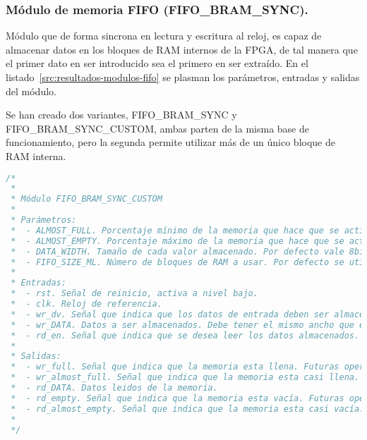 \subsubsection{Módulo de memoria FIFO (FIFO\_BRAM\_SYNC).}
Módulo que de forma sincrona en lectura y escritura al reloj, es capaz de almacenar datos en los bloques de RAM internos de la FPGA, de tal manera que el primer dato en ser introducido sea el primero en ser extraído. En el listado~\ref{src:resultados-modulos-fifo} se plasman los parámetros, entradas y salidas del módulo.

Se han creado dos variantes, FIFO\_BRAM\_SYNC y FIFO\_BRAM\_SYNC\_CUSTOM, ambas parten de la misma base de funcionamiento, pero la segunda permite utilizar más de un único bloque de RAM interna.

\begin{lstlisting}[language=Verilog,
    caption={Parámetros, entradas y salidas del módulo FIFO\_BRAM\_SYNC\_CUSTOM.},
    label=src:resultados-modulos-fifo]
/*
 *
 * Módulo FIFO_BRAM_SYNC_CUSTOM
 *
 * Parámetros:
 *  - ALMOST_FULL. Porcentaje mínimo de la memoria que hace que se active la señal wr_almost_full. Por defecto vale 0.9.
 *  - ALMOST_EMPTY. Porcentaje máximo de la memoria que hace que se active la señal rd_almost_empty. Por defecto vale 0.1.
 *  - DATA_WIDTH. Tamaño de cada valor almacenado. Por defecto vale 8bits.
 *  - FIFO_SIZE_ML. Número de bloques de RAM a usar. Por defecto se utiliza uno.
 *
 * Entradas:
 *  - rst. Señal de reinicio, activa a nivel bajo.
 *  - clk. Reloj de referencia.
 *  - wr_dv. Señal que indica que los datos de entrada deben ser almacenados.
 *  - wr_DATA. Datos a ser almacenados. Debe tener el mismo ancho que el parámetro DATA_WIDTH.
 *  - rd_en. Señal que indica que se desea leer los datos almacenados.
 *
 * Salidas:
 *  - wr_full. Señal que indica que la memoria esta llena. Futuras operaciones de escritura serán ignoradas.
 *  - wr_almost_full. Señal que indica que la memoria esta casi llena.
 *  - rd_DATA. Datos leidos de la memoria.
 *  - rd_empty. Señal que indica que la memoria esta vacía. Futuras operaciones de lectura serán ignoradas.
 *  - rd_almost_empty. Señal que indica que la memoria esta casi vacía.
 *
 */
\end{lstlisting}


